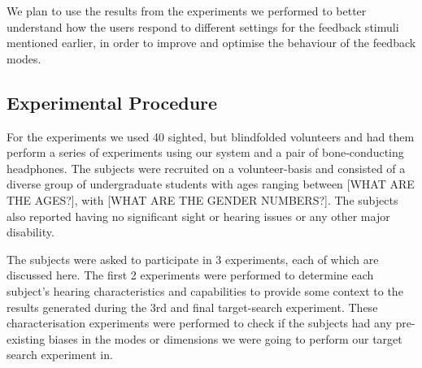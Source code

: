 \documentclass[format=sigconf, review=true, screen=true, anonymous=true]{acmart}
\begin{document}
We plan to use the results from the experiments we performed to better understand how the users respond to different settings for the feedback stimuli mentioned earlier, in order to improve and optimise the behaviour of the feedback modes.




\subsection{Experimental Procedure}

For the experiments we used 40 sighted, but blindfolded volunteers and had them perform a series of experiments using our system and a pair of bone-conducting headphones. The subjects were recruited on a volunteer-basis and consisted of a diverse group of undergraduate students with ages ranging between [WHAT ARE THE AGES?], with [WHAT ARE THE GENDER NUMBERS?]. The subjects also reported having no significant sight or hearing issues or any other major disability. 

The subjects were asked to participate in 3 experiments, each of which are discussed here. The first 2 experiments were performed to determine each subject's hearing characteristics and capabilities to provide some context to the results generated during the 3rd and final target-search experiment. These characterisation experiments were performed to check if the subjects had any pre-existing biases in the modes or dimensions we were going to perform our target search experiment in. 
\end{document}
